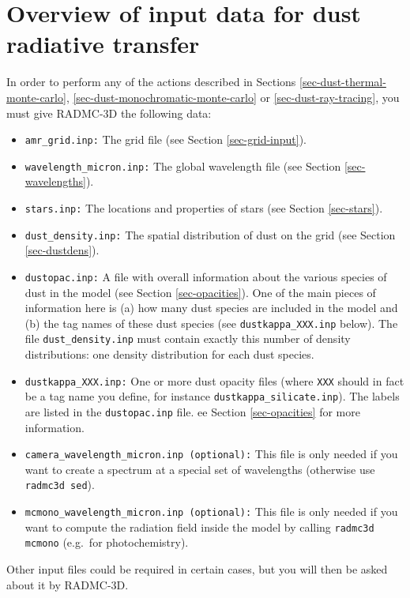 \documentclass{report}
\begin{document}
\section{Overview of input data for dust radiative transfer}
%
In order to perform any of the actions described in Sections
\ref{sec-dust-thermal-monte-carlo}, \ref{sec-dust-monochromatic-monte-carlo}
or \ref{sec-dust-ray-tracing}, you must give RADMC-3D the following 
data:
\begin{itemize}
\item {\small\tt amr\_grid.inp:} The grid file (see Section
  \ref{sec-grid-input}).
\item {\small\tt wavelength\_micron.inp:} The global wavelength file (see
  Section \ref{sec-wavelengths}).
\item {\small\tt stars.inp:} The locations and properties of stars (see
  Section \ref{sec-stars}).
\item {\small\tt dust\_density.inp:} The spatial distribution of dust
  on the grid (see Section \ref{sec-dustdens}).
\item {\small\tt dustopac.inp:} A file with overall information about
  the various species of dust in the model (see Section \ref{sec-opacities}).
  One of the main pieces of information here is (a) how many dust species
  are included in the model and (b) the tag names of these dust species
  (see {\small\tt dustkappa\_XXX.inp} below). The file 
  {\small\tt dust\_density.inp} must contain exactly this number of
  density distributions: one density distribution for each dust species.
\item {\small\tt dustkappa\_XXX.inp:} One or more dust opacity files (where
  {\small\tt XXX} should in fact be a tag name you define, for instance
  {\small\tt dustkappa\_silicate.inp}). The labels are listed in the
  {\small\tt dustopac.inp} file. ee Section \ref{sec-opacities} for more
  information.
\item {\small\tt camera\_wavelength\_micron.inp (optional):} This file is
  only needed if you want to create a spectrum at a special set of
  wavelengths (otherwise use {\small\tt radmc3d sed}).
\item {\small\tt mcmono\_wavelength\_micron.inp (optional):} This file is
  only needed if you want to compute the radiation field inside the model by
  calling {\small\tt radmc3d mcmono} (e.g.\ for photochemistry).
\end{itemize}
Other input files could be required in certain cases, but you will then
be asked about it by RADMC-3D.
\end{document}
